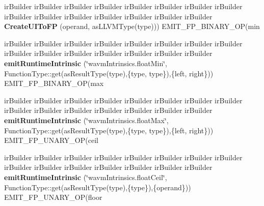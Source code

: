 \begin{DoxyCompactItemize}
\item 
\mbox{\label{struct_l_l_v_m_j_i_t_1_1_emit_function_context_a282e3a7ed7a81c7aba886ffcb07dae5a}} 
ir\+Builder ir\+Builder ir\+Builder ir\+Builder ir\+Builder ir\+Builder ir\+Builder ir\+Builder ir\+Builder ir\+Builder ir\+Builder ir\+Builder ir\+Builder ir\+Builder ir\+Builder {\bfseries Create\+U\+I\+To\+FP} (operand, as\+L\+L\+V\+M\+Type(type))) E\+M\+I\+T\+\_\+\+F\+P\+\_\+\+B\+I\+N\+A\+R\+Y\+\_\+\+OP(min
\item 
\mbox{\label{struct_l_l_v_m_j_i_t_1_1_emit_function_context_a2889b4ccf73232f68654d2924247da79}} 
ir\+Builder ir\+Builder ir\+Builder ir\+Builder ir\+Builder ir\+Builder ir\+Builder ir\+Builder ir\+Builder ir\+Builder ir\+Builder ir\+Builder ir\+Builder ir\+Builder ir\+Builder {\bfseries emit\+Runtime\+Intrinsic} (\char`\"{}wavm\+Intrinsics.\+float\+Min\char`\"{}, Function\+Type\+::get(as\+Result\+Type(type),\{type, type\}),\{left, right\})) E\+M\+I\+T\+\_\+\+F\+P\+\_\+\+B\+I\+N\+A\+R\+Y\+\_\+\+OP(max
\item 
\mbox{\label{struct_l_l_v_m_j_i_t_1_1_emit_function_context_ada750b4313a428341f225ccc8c0444de}} 
ir\+Builder ir\+Builder ir\+Builder ir\+Builder ir\+Builder ir\+Builder ir\+Builder ir\+Builder ir\+Builder ir\+Builder ir\+Builder ir\+Builder ir\+Builder ir\+Builder ir\+Builder {\bfseries emit\+Runtime\+Intrinsic} (\char`\"{}wavm\+Intrinsics.\+float\+Max\char`\"{}, Function\+Type\+::get(as\+Result\+Type(type),\{type, type\}),\{left, right\})) E\+M\+I\+T\+\_\+\+F\+P\+\_\+\+U\+N\+A\+R\+Y\+\_\+\+OP(ceil
\item 
\mbox{\label{struct_l_l_v_m_j_i_t_1_1_emit_function_context_ada37904ffbd91e49ed96167408a954b8}} 
ir\+Builder ir\+Builder ir\+Builder ir\+Builder ir\+Builder ir\+Builder ir\+Builder ir\+Builder ir\+Builder ir\+Builder ir\+Builder ir\+Builder ir\+Builder ir\+Builder ir\+Builder {\bfseries emit\+Runtime\+Intrinsic} (\char`\"{}wavm\+Intrinsics.\+float\+Ceil\char`\"{}, Function\+Type\+::get(as\+Result\+Type(type),\{type\}),\{operand\})) E\+M\+I\+T\+\_\+\+F\+P\+\_\+\+U\+N\+A\+R\+Y\+\_\+\+OP(floor
\item 
\mbox{\label{struct_l_l_v_m_j_i_t_1_1_emit_function_context_a784de1a19f69db70d7c97568d0c69c7f}} 

\end{DoxyCompactItemize}

